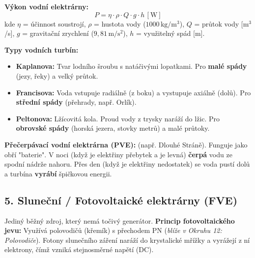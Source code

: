 \documentclass[a4paper,10pt]{article}
\newcommand{\jednotka}[1]{\,[\mathrm{#1}]}
\begin{document}
\begin{vysvetlenibox}
\begin{vzorcebox}
\textbf{Výkon vodní elektrárny:}
\[
P = \eta \cdot \rho \cdot Q \cdot g \cdot h \jednotka{W}
\]
kde $\eta$ = účinnost soustrojí, $\rho$ = hustota vody ($1000\,\mathrm{kg/m^3}$), $Q$ = průtok vody [m$^3$/s], $g$ = gravitační zrychlení ($9{,}81\,\mathrm{m/s^2}$), $h$ = využitelný spád [m].
\end{vzorcebox}

\textbf{Typy vodních turbín:}
\begin{itemize}
  \item \textbf{Kaplanova:} Tvar lodního šroubu s natáčivými lopatkami. Pro \textbf{malé spády} (jezy, řeky) a velký průtok.
  \item \textbf{Francisova:} Voda vstupuje radiálně (z boku) a vystupuje axiálně (dolů). Pro \textbf{střední spády} (přehrady, např. Orlík).
  \item \textbf{Peltonova:} Lžícovitá kola. Proud vody z trysky naráží do lžic. Pro \textbf{obrovské spády} (horská jezera, stovky metrů) a malé průtoky.
\end{itemize}

\textbf{Přečerpávací vodní elektrárna (PVE):} (např. Dlouhé Stráně). Funguje jako obří "baterie". V noci (když je elektřiny přebytek a je levná) \textbf{čerpá} vodu ze spodní nádrže nahoru. Přes den (když je elektřiny nedostatek) se voda pustí dolů a turbína \textbf{vyrábí} špičkovou energii.

\subsection*{5. Sluneční / Fotovoltaické elektrárny (FVE)}

Jediný běžný zdroj, který nemá točivý generátor.
\textbf{Princip fotovoltaického jevu:} Využívá polovodičů (křemík) s přechodem PN (\textit{blíže v Okruhu 12: Polovodiče}). Fotony slunečního záření naráží do krystalické mřížky a vyrážejí z ní elektrony, čímž vzniká stejnosměrné napětí (DC).

\begin{center}
\end{center}
\end{vysvetlenibox}
\end{document}

